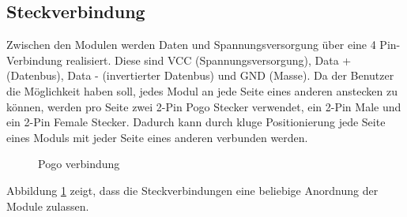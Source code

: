 \subsection{Steckverbindung}
Zwischen den Modulen werden Daten und Spannungsversorgung über eine 4 Pin-Verbindung realisiert. Diese sind VCC (Spannungsversorgung), Data + (Datenbus), Data - (invertierter Datenbus) und GND (Masse). Da der Benutzer die Möglichkeit haben soll, jedes Modul an jede Seite eines anderen anstecken zu können, werden pro Seite zwei 2-Pin Pogo Stecker verwendet, ein 2-Pin Male und ein 2-Pin Female Stecker. Dadurch kann durch kluge Positionierung jede Seite eines Moduls mit jeder Seite eines anderen verbunden werden.
\begin{figure}[H]
    \centering    
    \caption{Pogo verbindung}
    \label{pogo_verbindung}
\end{figure}
 \noindent Abbildung \ref{pogo_verbindung} zeigt, dass die Steckverbindungen eine beliebige Anordnung der Module zulassen.